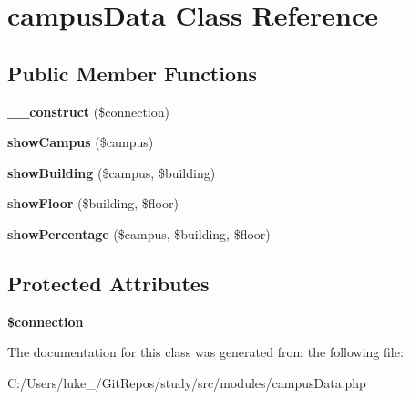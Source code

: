 \hypertarget{classcampus_data}{}\section{campus\+Data Class Reference}
\label{classcampus_data}
\subsection*{Public Member Functions}
\begin{DoxyCompactItemize}
\item 
\mbox{\label{classcampus_data_a155afedbdfa01f1c0b813ca97642cdab}} 
{\bfseries \+\_\+\+\_\+construct} (\$connection)
\item 
\mbox{\label{classcampus_data_a44f1432857c94c899e009f70b1c9c913}} 
{\bfseries show\+Campus} (\$campus)
\item 
\mbox{\label{classcampus_data_a107cd08a7743650b60a3caa1e838d705}} 
{\bfseries show\+Building} (\$campus, \$building)
\item 
\mbox{\label{classcampus_data_a2edd7e91697d0fc9bb5a4ea3a900d7d5}} 
{\bfseries show\+Floor} (\$building, \$floor)
\item 
\mbox{\label{classcampus_data_ab466d8e6556710038773999085459d25}} 
{\bfseries show\+Percentage} (\$campus, \$building, \$floor)
\end{DoxyCompactItemize}
\subsection*{Protected Attributes}
\begin{DoxyCompactItemize}
\item 
\mbox{\label{classcampus_data_a0d9c79b9b86b3f5891c6d3892f12c6a0}} 
{\bfseries \$connection}
\end{DoxyCompactItemize}


The documentation for this class was generated from the following file\+:\begin{DoxyCompactItemize}
\item 
C\+:/\+Users/luke\+\_\+/\+Git\+Repos/study/src/modules/campus\+Data.\+php\end{DoxyCompactItemize}

